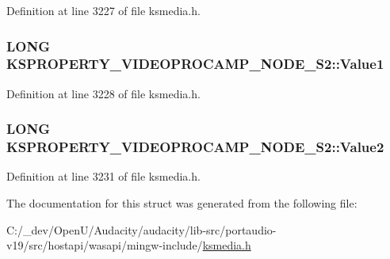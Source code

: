 Definition at line 3227 of file ksmedia.\+h.

\subsubsection[{\texorpdfstring{Value1}{Value1}}]{\setlength{\rightskip}{0pt plus 5cm}L\+O\+NG K\+S\+P\+R\+O\+P\+E\+R\+T\+Y\+\_\+\+V\+I\+D\+E\+O\+P\+R\+O\+C\+A\+M\+P\+\_\+\+N\+O\+D\+E\+\_\+\+S2\+::\+Value1}\hypertarget{struct_k_s_p_r_o_p_e_r_t_y___v_i_d_e_o_p_r_o_c_a_m_p___n_o_d_e___s2_ab78f724c54039caa03e8f2e73a5bbe37}{}\label{struct_k_s_p_r_o_p_e_r_t_y___v_i_d_e_o_p_r_o_c_a_m_p___n_o_d_e___s2_ab78f724c54039caa03e8f2e73a5bbe37}


Definition at line 3228 of file ksmedia.\+h.

\subsubsection[{\texorpdfstring{Value2}{Value2}}]{\setlength{\rightskip}{0pt plus 5cm}L\+O\+NG K\+S\+P\+R\+O\+P\+E\+R\+T\+Y\+\_\+\+V\+I\+D\+E\+O\+P\+R\+O\+C\+A\+M\+P\+\_\+\+N\+O\+D\+E\+\_\+\+S2\+::\+Value2}\hypertarget{struct_k_s_p_r_o_p_e_r_t_y___v_i_d_e_o_p_r_o_c_a_m_p___n_o_d_e___s2_afd9cec1b857cbc9fcfc35fe462c5c2ab}{}\label{struct_k_s_p_r_o_p_e_r_t_y___v_i_d_e_o_p_r_o_c_a_m_p___n_o_d_e___s2_afd9cec1b857cbc9fcfc35fe462c5c2ab}


Definition at line 3231 of file ksmedia.\+h.



The documentation for this struct was generated from the following file\+:\begin{DoxyCompactItemize}
\item 
C\+:/\+\_\+dev/\+Open\+U/\+Audacity/audacity/lib-\/src/portaudio-\/v19/src/hostapi/wasapi/mingw-\/include/\hyperlink{ksmedia_8h}{ksmedia.\+h}\end{DoxyCompactItemize}
